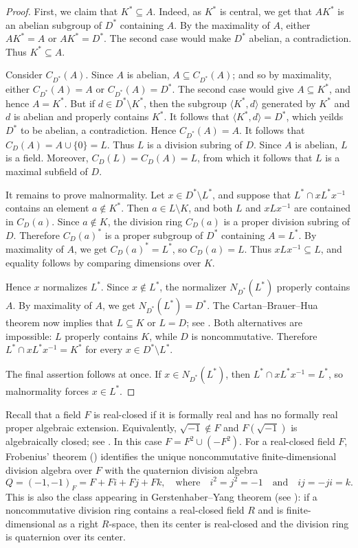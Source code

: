 \documentclass[11pt]{amsart}
\theoremstyle{definition}
\begin{document}
\begin{proof}
First, we claim that $K^*\subseteq A$. Indeed, as $K^*$ is central, we get that $AK^*$ is an abelian subgroup of $D^*$
containing $A$. By the maximality of $A$, either $AK^*=A$ or $AK^*=D^*$. The second
case would make $D^*$ abelian, a contradiction. Thus $K^*\subseteq A$.

Consider $C_{D^*}(A)$. Since $A$ is abelian, $A\subseteq C_{D^*}(A)$; and so by
maximality, either $C_{D^*}(A)=A$ or $C_{D^*}(A)=D^*$. The second case
would give $A\subseteq K^*$, and hence $A=K^*$. But if $d\in D^*\setminus K^*$,
then the subgroup $\langle K^*, d\rangle$ generated by $K^*$ and $d$ is abelian and properly contains
$K^*$. It follows that $\langle K^*, d\rangle=D^*$, which yeilds $D^*$
to be abelian, a contradiction. Hence $C_{D^*}(A)=A$. It follows that $C_D(A)=A\cup\{0\}=L$. Thus $L$ is a division subring of
$D$. Since $A$ is abelian, $L$ is a field. Moreover, $C_D(L)=C_D(A)=L$, from which it follows that $L$ is a maximal subfield of $D$.

It remains to prove malnormality. Let $x\in D^*\setminus L^*$, and suppose
that $L^*\cap xL^*x^{-1}$ contains an element $a\notin K^*$. Then
$a\in L\setminus K$, and both $L$ and $xLx^{-1}$ are contained in $C_D(a)$.
Since $a\notin K$, the division ring $C_D(a)$ is a proper division subring of
$D$. Therefore $C_D(a)^*$ is a proper subgroup of $D^*$ containing $A=L^*$.
By maximality of $A$, we get $C_D(a)^*=L^*$, so $C_D(a)=L$. Thus
$xLx^{-1}\subseteq L$, and equality follows by comparing dimensions over $K$.

Hence $x$ normalizes $L^*$. Since $x\notin L^*$, the normalizer
$N_{D^*}(L^*)$ properly contains $A$. By maximality of $A$, we get
$N_{D^*}(L^*)=D^*$. The Cartan--Brauer--Hua theorem now implies that
$L\subseteq K$ or $L=D$; see \cite[(13.7)]{L}. Both alternatives are impossible: $L$ properly
contains $K$, while $D$ is noncommutative. Therefore
$L^*\cap xL^*x^{-1}=K^*$ for every $x\in D^*\setminus L^*$.

The final assertion follows at once. If $x\in N_{D^*}(L^*)$, then
$L^*\cap xL^*x^{-1}=L^*$, so malnormality forces $x\in L^*$.
\end{proof}

Recall that a field $F$ is real-closed if it is formally real and has no
formally real proper algebraic extension. Equivalently,
$\sqrt{-1}\notin F$ and $F(\sqrt{-1})$ is algebraically closed; see \cite[p.~209]{L}. In this case
$F=F^2\cup(-F^2)$. For a real-closed field $F$, Frobenius' theorem (\cite[Theorem 15.10]{L}) identifies the unique noncommutative finite-dimensional division algebra over $F$ with the quaternion division algebra
$$
        Q=(-1,-1)_F
        =F+Fi+Fj+Fk,
        \quad\text{where}\quad i^2=j^2=-1\quad\text{and}\quad ij=-ji=k.
$$
This is also the class appearing in Gerstenhaber--Yang theorem (see \cite[Theorem 15.10]{L}): if a
noncommutative division ring contains a real-closed field $R$ and is
finite-dimensional as a right $R$-space, then its center is real-closed and
the division ring is quaternion over its center.
\end{document}

